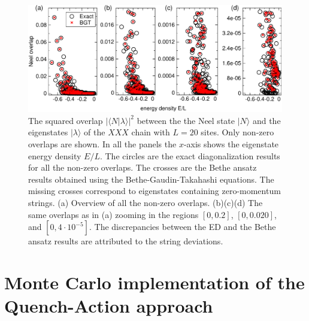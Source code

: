 \documentclass[11pt]{iopart}
\begin{document}
\begin{figure}[t]
\begin{center}
\includegraphics[width=.9\textwidth]{./draft_figs/L20_BT_check}
\end{center}
\caption{ The squared overlap $|\langle N|\lambda\rangle|^2$ between the the 
 Neel state $|N\rangle$ and the eigenstates $|\lambda\rangle$ of the $XXX$ 
 chain with $L=20$ sites. Only non-zero overlaps are shown. In all the panels the 
 $x$-axis shows the eigenstate energy density $E/L$. The circles are the exact 
 diagonalization results for all the non-zero overlaps. The crosses are the Bethe 
 ansatz results obtained using the Bethe-Gaudin-Takahashi equations. The missing 
 crosses correspond to eigenstates containing zero-momentum strings. (a) Overview 
 of all the non-zero overlaps. (b)(c)(d) The same overlaps as in (a) zooming in 
 the regions $[0,0.2]$, $[0,0.020]$, and $[0,4\cdot 10^{-5}]$. The discrepancies 
 between the ED and the Bethe ansatz results are attributed to the string 
 deviations. 
}
\label{fig1-BGT-check}
\end{figure}



\section{Monte Carlo implementation of the Quench-Action approach}
\label{mcqa-sec}
\end{document}
